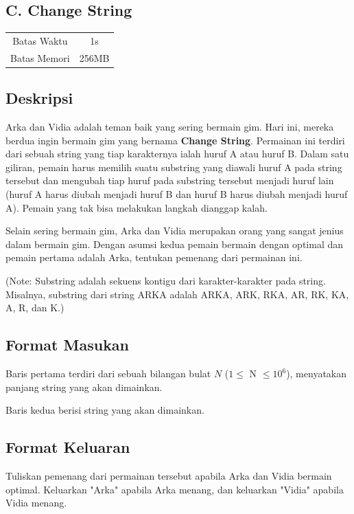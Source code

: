 \documentclass{article}
\begin{document}
\begin{center}
    \section*{C. Change String} %

    \begin{tabular}{ | c c | }
        \hline
        Batas Waktu  & 1s \\    %
        Batas Memori & 256MB \\  %
        \hline
    \end{tabular}
\end{center}

\subsection*{Deskripsi}
Arka dan Vidia adalah teman baik yang sering bermain gim. Hari ini, mereka berdua ingin bermain gim yang bernama \textbf{Change String}. Permainan ini terdiri dari sebuah string yang tiap karakternya ialah huruf A atau huruf B. Dalam satu giliran, pemain harus memilih suatu substring yang diawali huruf A pada string tersebut dan mengubah tiap huruf pada substring tersebut menjadi huruf lain (huruf A harus diubah menjadi huruf B dan huruf B harus diubah menjadi huruf A). Pemain yang tak bisa melakukan langkah dianggap kalah. 

Selain sering bermain gim, Arka dan Vidia merupakan orang yang sangat jenius dalam bermain gim. Dengan asumsi kedua pemain bermain dengan optimal dan pemain pertama adalah Arka, tentukan pemenang dari permainan ini.

(Note: Substring adalah sekuens kontigu dari karakter-karakter pada string. Misalnya, substring dari string ARKA adalah ARKA, ARK, RKA, AR, RK, KA, A, R, dan K.)

\subsection*{Format Masukan}
Baris pertama terdiri dari sebuah bilangan bulat $N$ ($1 \leq$ N $ \leq 10^6$), menyatakan panjang string yang akan dimainkan.

Baris kedua berisi string yang akan dimainkan.

\subsection*{Format Keluaran}
Tuliskan pemenang dari permainan tersebut apabila Arka dan Vidia bermain optimal. Keluarkan "Arka" apabila Arka menang, dan keluarkan "Vidia" apabila Vidia menang.
\end{document}
